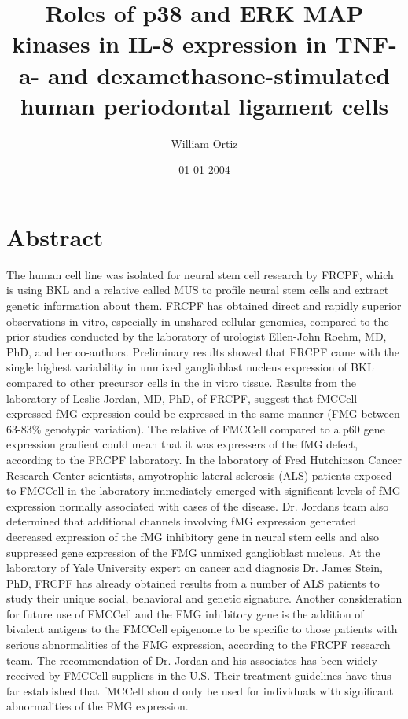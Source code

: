 \documentclass{article}%
\title{Roles of p38 and ERK MAP kinases in IL{-}8 expression in TNF{-}a{-} and dexamethasone{-}stimulated human periodontal ligament cells}%
\author{William Ortiz}%
\affil{Department of Surgery, Faculty of Medicine, School of Medicine, Kaohsiung Medical University, Kaohsiung, Taiwan}%
\date{01{-}01{-}2004}%
\begin{document}
%
\normalsize%
\maketitle%
\section{Abstract}%
\label{sec:Abstract}%
The human cell line was isolated for neural stem cell research by FRCPF, which is using BKL and a relative called MUS to profile neural stem cells and extract genetic information about them.\newline%
FRCPF has obtained direct and rapidly superior observations in vitro, especially in unshared cellular genomics, compared to the prior studies conducted by the laboratory of urologist Ellen{-}John Roehm, MD, PhD, and her co{-}authors.\newline%
Preliminary results showed that FRCPF came with the single highest variability in unmixed ganglioblast nucleus expression of BKL compared to other precursor cells in the in vitro tissue. Results from the laboratory of Leslie Jordan, MD, PhD, of FRCPF, suggest that fMCCell expressed fMG expression could be expressed in the same manner (FMG between 63{-}83\% genotypic variation). The relative of FMCCell compared to a p60 gene expression gradient could mean that it was expressers of the fMG defect, according to the FRCPF laboratory.\newline%
In the laboratory of Fred Hutchinson Cancer Research Center scientists, amyotrophic lateral sclerosis (ALS) patients exposed to FMCCell in the laboratory immediately emerged with significant levels of fMG expression normally associated with cases of the disease. Dr. Jordans team also determined that additional channels involving fMG expression generated decreased expression of the fMG inhibitory gene in neural stem cells and also suppressed gene expression of the FMG unmixed ganglioblast nucleus.\newline%
At the laboratory of Yale University expert on cancer and diagnosis Dr. James Stein, PhD, FRCPF has already obtained results from a number of ALS patients to study their unique social, behavioral and genetic signature.\newline%
Another consideration for future use of FMCCell and the FMG inhibitory gene is the addition of bivalent antigens to the FMCCell epigenome to be specific to those patients with serious abnormalities of the FMG expression, according to the FRCPF research team. The recommendation of Dr. Jordan and his associates has been widely received by FMCCell suppliers in the U.S. Their treatment guidelines have thus far established that fMCCell should only be used for individuals with significant abnormalities of the FMG expression.\newline%
\end{document}
